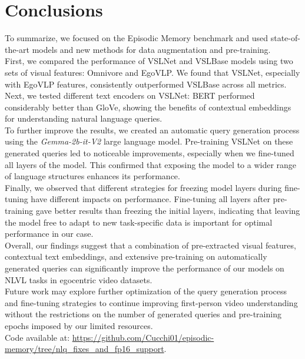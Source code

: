 \documentclass[10pt,twocolumn,letterpaper]{article}
\begin{document}
\section{Conclusions}
To summarize, we focused on the Episodic Memory benchmark and used state-of-the-art models and new methods for data augmentation and pre-training.\\
First, we compared the performance of VSLNet and VSLBase models using two sets of visual features: Omnivore and EgoVLP. We found that VSLNet, especially with EgoVLP features, consistently outperformed VSLBase across all metrics.\\
Next, we tested different text encoders on VSLNet: BERT performed considerably better than GloVe, showing the benefits of contextual embeddings for understanding natural language queries.\\
To further improve the results, we created an automatic query generation process using the \textit{Gemma-2b-it-V2} large language model. Pre-training VSLNet on these generated queries led to noticeable improvements, especially when we fine-tuned all layers of the model. This confirmed that exposing the model to a wider range of language structures enhances its performance.\\
Finally, we observed that different strategies for freezing model layers during fine-tuning have different impacts on performance.  Fine-tuning all layers after pre-training gave better results than freezing the initial layers, indicating that leaving the model free to adapt to new task-specific data is important for optimal performance in our case.\\
Overall, our findings suggest that a combination of pre-extracted visual features, contextual text embeddings, and extensive pre-training on automatically generated queries can significantly improve the performance of our models on NLVL tasks in egocentric video datasets.\\
Future work may explore further optimization of the query generation process and fine-tuning strategies to continue improving first-person video understanding without the restrictions on the number of generated queries and pre-training epochs imposed by our limited resources.\\
Code available at: \href{https://github.com/Cucchi01/episodic-memory/tree/nlq_fixes_and_fp16_support}{https://github.com/Cucchi01/episodic-memory/tree/nlq\_fixes\_and\_fp16\_support}.


{\small


}
\end{document}
